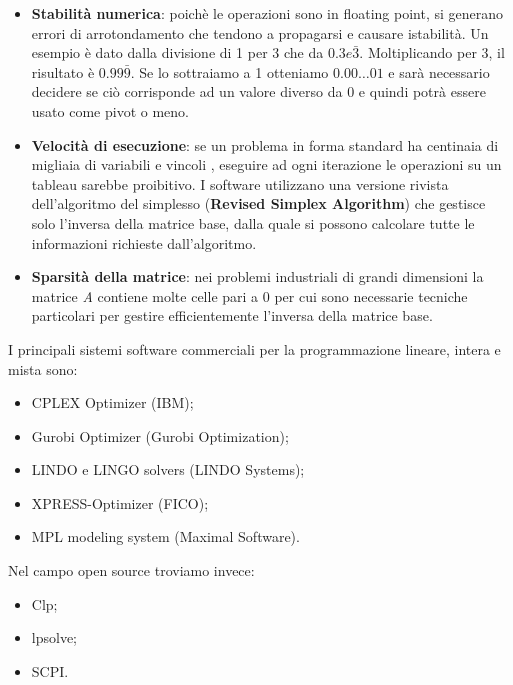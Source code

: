 \documentclass[11pt]{book}
\begin{document}
\begin{itemize}
\item {\bf Stabilit\`a numerica}: poich\`e le operazioni sono in
  floating point, si generano errori di arrotondamento che tendono a
  propagarsi e causare istabilit\`a. Un esempio \`e dato dalla
  divisione di 1 per 3 che da $0.3e\bar{3}$. Moltiplicando per 3, il
  risultato \`e $0.99\bar{9}$. Se lo sottraiamo a 1 otteniamo
  $0.00\dots 01$ e sar\`a necessario decidere se ci\`o corrisponde ad
  un valore diverso da 0 e quindi potr\`a essere usato come pivot o
  meno.
  
\item {\bf Velocit\`a di esecuzione}: se un problema in forma standard
  ha centinaia di migliaia di variabili e vincoli , eseguire ad ogni
  iterazione le operazioni su un tableau sarebbe proibitivo. I
  software utilizzano una versione rivista dell'algoritmo del
  simplesso ({\bf Revised Simplex Algorithm}) che gestisce solo
  l'inversa della matrice base, dalla quale si possono calcolare tutte
  le informazioni richieste dall'algoritmo.

\item {\bf Sparsit\`a della matrice}: nei problemi industriali di
  grandi dimensioni la matrice {\em A} contiene molte celle pari a 0
  per cui sono necessarie tecniche particolari per gestire
  efficientemente l'inversa della matrice base.
\end{itemize}

I principali sistemi software commerciali per la programmazione lineare, intera e
mista sono:

\begin{itemize}
\item CPLEX Optimizer (IBM);
\item Gurobi Optimizer (Gurobi Optimization);
\item LINDO e LINGO solvers (LINDO Systems);
\item XPRESS-Optimizer (FICO);
\item MPL modeling system (Maximal Software).
\end{itemize}

Nel campo open source troviamo invece:

\begin{itemize}
\item Clp;
\item lpsolve;
\item SCPI.
\end{itemize}
\end{document}

